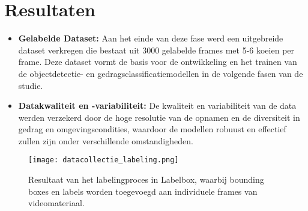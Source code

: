 \section{Resultaten}
\begin{itemize}
  \item \textbf{Gelabelde Dataset:}  Aan het einde van deze fase werd een uitgebreide dataset verkregen die bestaat uit 3000 gelabelde frames met 5-6 koeien per frame. Deze dataset vormt de basis voor de ontwikkeling en het trainen van de objectdetectie- en gedragsclassificatiemodellen in de volgende fasen van de studie.
  \item \textbf{Datakwaliteit en -variabiliteit:} De kwaliteit en variabiliteit van de data werden verzekerd door de hoge resolutie van de opnamen en de diversiteit in gedrag en omgevingscondities, waardoor de modellen robuust en effectief zullen zijn onder verschillende omstandigheden.
\end{itemize}
\newline
\begin{figure}[H]
  \centering
  \texttt{[image: datacollectie\_labeling.png]}
  \caption{Resultaat van het labelingproces in Labelbox, waarbij bounding boxes en labels worden toegevoegd aan individuele frames van videomateriaal.}
  \label{fig:datacollectie_labeling}  
\end{figure}
\newline